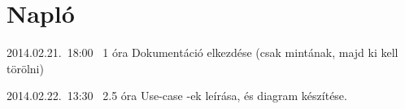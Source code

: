 %
\section{Napló}

\begin{naplo}

\bejegyzes
{2014.02.21.~18:00~} %
{1 óra} %
{\antal} %
{Dokumentáció elkezdése (csak mintának, majd ki kell törölni)} %

\bejegyzes
{2014.02.22.~13:30~}
{2.5 óra}
{\adam}
{Use-case -ek leírása, és diagram készítése.}

\end{naplo}

